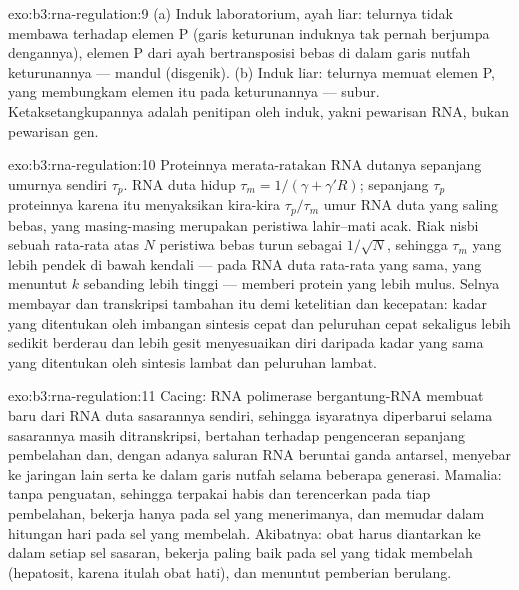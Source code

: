 \begin{solution}{exo:b3:rna-regulation:9}
(a) Induk laboratorium, ayah liar: telurnya tidak membawa  terhadap
elemen P (garis keturunan induknya tak pernah berjumpa dengannya), elemen P
dari ayah bertransposisi bebas di dalam garis nutfah keturunannya --- mandul
(disgenik). (b) Induk liar: telurnya memuat  elemen P, yang
membungkam elemen itu pada keturunannya --- subur. Ketaksetangkupannya adalah
penitipan  oleh induk, yakni pewarisan RNA, bukan pewarisan gen.
\end{solution}

\begin{solution}{exo:b3:rna-regulation:10}
Proteinnya merata-ratakan RNA dutanya sepanjang umurnya sendiri $\tau_{p}$.
RNA duta hidup $\tau_{m} = 1/(\gamma + \gamma' R)$; sepanjang $\tau_{p}$
proteinnya karena itu menyaksikan kira-kira $\tau_{p}/\tau_{m}$ umur RNA duta
yang saling bebas, yang masing-masing merupakan peristiwa lahir--mati acak.
Riak nisbi sebuah rata-rata atas $N$ peristiwa bebas turun sebagai
$1/\sqrt{N}$, sehingga $\tau_{m}$ yang lebih pendek di bawah kendali
 --- pada RNA duta rata-rata yang sama, yang menuntut $k$ sebanding
lebih tinggi --- memberi protein yang lebih mulus. Selnya membayar 
dan transkripsi tambahan itu demi ketelitian dan kecepatan: kadar yang
ditentukan oleh imbangan sintesis cepat dan peluruhan cepat sekaligus lebih
sedikit berderau dan lebih gesit menyesuaikan diri daripada kadar yang sama
yang ditentukan oleh sintesis lambat dan peluruhan lambat.
\end{solution}

\begin{solution}{exo:b3:rna-regulation:11}
Cacing: RNA polimerase bergantung-RNA membuat  baru dari RNA duta
sasarannya sendiri, sehingga isyaratnya diperbarui selama sasarannya masih
ditranskripsi, bertahan terhadap pengenceran sepanjang pembelahan dan, dengan
adanya saluran RNA beruntai ganda antarsel, menyebar ke jaringan lain serta
ke dalam garis nutfah selama beberapa generasi. Mamalia: tanpa penguatan,
sehingga  terpakai habis dan terencerkan pada tiap pembelahan,
bekerja hanya pada sel yang menerimanya, dan memudar dalam hitungan hari pada
sel yang membelah. Akibatnya: obat  harus diantarkan ke dalam setiap sel
sasaran, bekerja paling baik pada sel yang tidak membelah (hepatosit, karena
itulah obat hati), dan menuntut pemberian berulang.
\end{solution}

